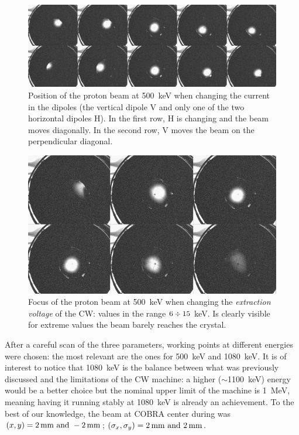 \begin{refsection}
        \begin{figure}
            \centering
            \includegraphics[width = \textwidth]{Figures/X17/beamtuning/psotion_500keV.png}
            \caption{Position of the proton beam at \SI{500}{keV} when changing the current in the dipoles (the vertical dipole V and only one of the two horizontal dipoles H). In the first row, H is changing and the beam moves diagonally. In the second row, V moves the beam on the perpendicular diagonal.}
            \label{fig:position_500keV}
        \end{figure}
        \begin{figure}
            \centering
            \includegraphics[width = \textwidth]{Figures/X17/beamtuning/focus_500keV.png}
            \caption{Focus of the proton beam at \SI{500}{keV} when changing the \textit{extraction voltage} of the CW: values in the range $6\divisionsymbol15$ keV. Is clearly visible for extreme values the beam barely reaches the crystal.}
            \label{fig:focus_500keV}
        \end{figure}
        \noindent
        After a careful scan of the three parameters, working points at different energies were chosen: the most relevant are the ones for \SI{500}{keV} and \SI{1080}{keV}.
        It is of interest to notice that \SI{1080}{keV} is the balance between what was previously discussed and the limitations of the CW machine: a higher ($\sim$\SI{1100}{keV}) energy would be a better choice but the nominal upper limit of the machine is \SI{1}{MeV}, meaning having it running stably at \SI{1080}{keV} is already an achievement.
        To the best of our knowledge, the beam at COBRA center during was $(x, y) = \SIlist{2; -2}{mm}$; $(\sigma_x, \sigma_y) = \SIlist{2; 2}{mm}$.\\


\end{refsection}

